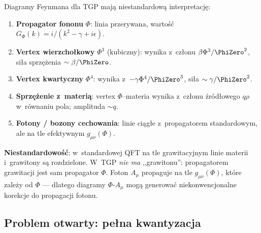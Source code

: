 \begin{remark}\label{rem:feynman-rules}
Diagramy Feynmana dla TGP mają niestandardową interpretację:
\begin{enumerate}[nosep]
    \item \textbf{Propagator fononu} $\Phi$: linia przerywana,
          wartość $G_\Phi(k) = i/(k^2 - \gamma + i\epsilon)$.
    \item \textbf{Vertex wierzchołkowy} $\Phi^3$ (kubiczny):
          wynika z~członu $\beta\Phi^3/\PhiZero^2$, siła
          sprzężenia $\sim \beta/\PhiZero$.
    \item \textbf{Vertex kwartyczny} $\Phi^4$:
          wynika z~$-\gamma\Phi^4/\PhiZero^3$,
          siła $\sim \gamma/\PhiZero^2$.
    \item \textbf{Sprzężenie z~materią}: vertex $\Phi$--materia
          wynika z~członu źródłowego $q\rho$ w~równaniu pola;
          amplituda $\sim q$.
    \item \textbf{Fotony / bozony cechowania}: linie ciągłe
          z~propagatorem standardowym, ale na tle efektywnym
          $g_{\mu\nu}(\Phi)$.
\end{enumerate}

\textbf{Niestandardowość}: w~standardowej QFT na tle grawitacyjnym
linie materii i~grawitony są rozdzielone. W~TGP \emph{nie ma}
,,grawitonu'': propagatorem grawitacji jest sam propagator $\Phi$.
Foton $A_\mu$ propaguje na tle $g_{\mu\nu}(\Phi)$, które zależy
od $\Phi$ --- dlatego diagramy $\Phi$-$A_\mu$ mogą generować
niekonwencjonalne korekcje do propagacji fotonu.
\end{remark}

\subsection{Problem otwarty: pełna kwantyzacja}%
\label{app:E-open}

